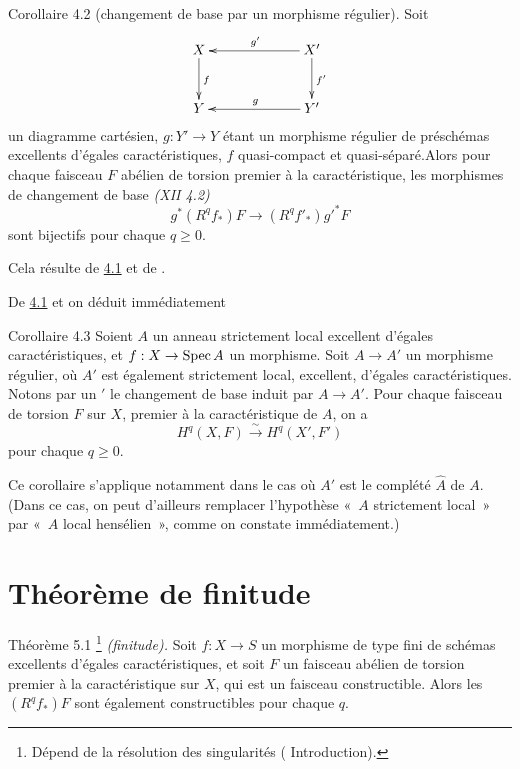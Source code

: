 \documentclass[10pt]{../fichiers-configuration-latex/smfart}
\begin{document}
\begin{enonce*}{Corollaire 4.2}
(changement de base par un morphisme régulier). Soit
$$
\xymatrix@C=2.25cm@R=1cm{
X \ar[d]^{f}& X'\ar[l]_{g'} \ar[d]^{f'}\\
Y & Y'\ar[l]_{g}
}
$$
un diagramme cartésien, $g:Y'\rightarrow Y$ étant un morphisme
régulier de préschémas excellents d'égales caractéristiques, $f$
quasi-compact et quasi-séparé.\pageoriginale Alors pour chaque
faisceau $F$ abélien de torsion premier à la caractéristique, les
morphismes de changement de base \emph{(XII 4.2)}
$$
g^{\ast}(R^{q}f_{\ast})F\longrightarrow (R^{q}f'_{\ast}){g'}^{\ast}F
$$
sont bijectifs pour chaque $q\geq 0$.
\end{enonce*}

Cela résulte de \hyperref[XIX.thm4.1]{4.1} et de .

De \hyperref[XIX.thm4.1]{4.1} et  on déduit immédiatement

\begin{enonce*}{Corollaire 4.3}
Soient $A$ un anneau strictement local excellent d'égales
caractéristiques, et $f:X\rightarrow \operatorname{Spec} A$ un morphisme. Soit
$A\rightarrow A'$ un morphisme régulier, où $A'$ est également
strictement local, excellent, d'égales caractéristiques. Notons par un
$'$ le changement de base induit par $A\rightarrow A'$. Pour chaque
faisceau de torsion $F$ sur $X$, premier à la caractéristique de $A$,
on a
$$
H^{q}(X,F)\xrightarrow{\sim} H^{q}(X',F')
$$
pour chaque $q\geq 0$.
\end{enonce*}

Ce corollaire s'applique notamment dans le cas où $A'$ est le complété
$\hat{A}$ de $A$. (Dans ce cas, on peut d'ailleurs remplacer
l'hypothèse « $A$ strictement local » par « $A$ local
hensélien », comme on constate immédiatement.)

\section{Théorème de finitude}\pageoriginale

\begin{enonce*}{Théorème 5.1}
\footnote[1]{Dépend de la résolution des singularités (\cf
Introduction).} \emph{(finitude).} Soit $f:X\rightarrow S$ un
morphisme de type fini de schémas excellents d'égales
caractéristiques, et soit $F$ un faisceau abélien de torsion premier à
la caractéristique sur $X$, qui est un faisceau constructible. Alors
les $(R^{q}f_{\ast})F$ sont également constructibles pour chaque $q$.
\end{enonce*}
\end{document}
